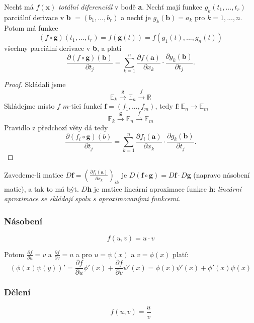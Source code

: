 \documentclass[../main.tex]{subfiles}
\begin{document}
\begin{theorem}
	Nechť má $f(\textbf{x})$ \textit{totální diferenciál} v bodě \textbf{a}. Nechť mají funkce $g_k(t_1,...,t_r)$ parciální 
	derivace v \textbf{b} $= (b_1,...,b_r)$ a nechť je $g_k(\textbf{b}) = a_k$ pro $k = 1,...,n.$ Potom má funkce
	\[(f\circ \textbf{g})(t_1,...,t_r) = f(\textbf{g}(t)) = f(g_1(t),...,g_n(t))\]
	všechny parciální derivace v \textbf{b}, a platí 
	\[\frac{\partial (f \circ \textbf{g})(\textbf{b})}{\partial t_j} = \sum^n_{k=1}\frac{\partial f(\textbf{a})}{\partial x_k}
	\cdot \frac{\partial g_k(\textbf{b})}{\partial t_j}.\]
\end{theorem}

\begin{proof}
	Skládali jsme
	\[\mathbb{E}_k \xrightarrow{\mathbf{g}} \mathbb{E}_n \xrightarrow{\textit{f}} \mathbb{R} \]
	Skládejme místo $f$ $m$-tici funkcí
	$\mathbf{f} = (f_1,...,f_m)$, tedy $\mathbf{f}: \mathbb{E}_n \rightarrow \mathbb{E}_m$
	\[\mathbb{E}_k \xrightarrow{\mathbf{g}} \mathbb{E}_n \xrightarrow{\textit{f}} \mathbb{E}_m \]
	Pravidlo z předchozí věty dá tedy
	\[\frac{\partial (f_i \circ \mathbf{g})(b)}{\partial t_j} = \sum^n_{k=1} \frac{\partial f_i(\mathbf{a})}{\partial x_k}
	\cdot \frac{\partial g_k(\mathbf{b})}{\partial t_j}.\]
\end{proof}

\begin{remark}
	Zavedeme-li matice $D\mathbf{f} = \left(\frac{\partial f_i(\mathbf{a})}{\partial x_k}\right)_{ik}$ je 
	$D(\mathbf{f}\circ \mathbf{g}) = D\mathbf{f}\cdot D\mathbf{g}$ (napravo násobení matic), a tak to má být. $D\mathbf{h}$ je matice lineární aproximace 
	funkce $\mathbf{h}$: \textit{lineární aproximace se skládají spolu s aproximovanými funkcemi}.
\end{remark}

\subsubsection{Násobení}
\[ f(u,v) = u \cdot v \]

Potom $ \frac{\partial f}{\partial u} = v $ a $ \frac{\partial f}{\partial v} = u $
a pro $u = \psi (x)$ a $ v = \phi (x) $ platí:
\[ (\phi (x) \psi (y))' =
\frac{\partial f}{\partial u} \phi '(x) + \frac{\partial f}{\partial v} \psi '(x) = 
\phi (x)\psi '(x) + \phi '(x)\psi (x)  \]

\subsubsection{Dělení}
\[ f(u,v) = \frac{u}{v} \]
\end{document}
